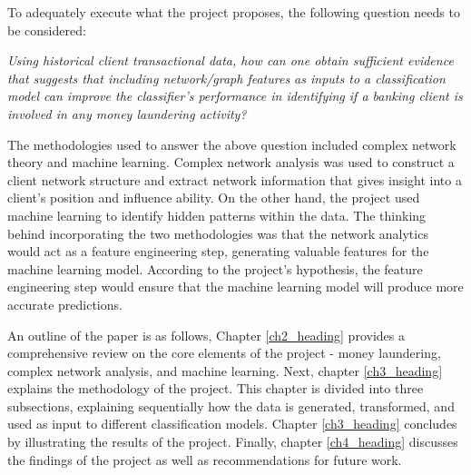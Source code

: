 To adequately execute what the project proposes, the following question needs to be considered: 
\begin{center}
\textit{Using historical client transactional data, how can one obtain sufficient evidence that suggests that including network/graph features as inputs to a classification model can improve the classifier's performance in identifying if a banking client is involved in any money laundering activity?}    
\end{center} 

The methodologies used to answer the above question included complex network theory and machine learning. Complex network analysis was used to construct a client network structure and extract network information that gives insight into a client's position and influence ability. On the other hand, the project used machine learning to identify hidden patterns within the data. The thinking behind incorporating the two methodologies was that the network analytics would act as a feature engineering step, generating valuable features for the machine learning model. According to the project's hypothesis, the feature engineering step would ensure that the machine learning model will produce more accurate predictions.  

An outline of the paper is as follows, Chapter \ref{ch2_heading} provides a comprehensive review on the core elements of the project - money laundering, complex network analysis, and machine learning. Next, chapter \ref{ch3_heading} explains the methodology of the project. This chapter is divided into three subsections, explaining sequentially how the data is generated, transformed, and used as input to different classification models. Chapter \ref{ch3_heading} concludes by illustrating the results of the project. Finally, chapter \ref{ch4_heading} discusses the findings of the project as well as recommendations for future work.         

